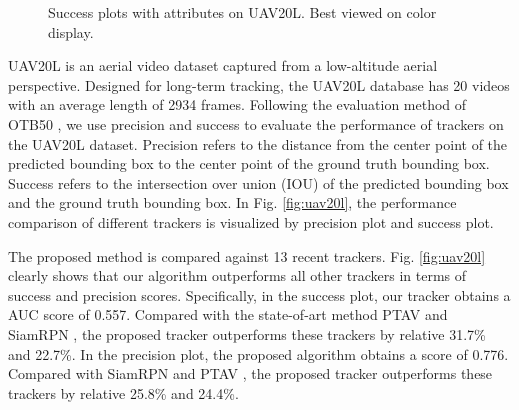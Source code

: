 \begin{figure}
\begin{center}
\end{center}
   \caption{Success plots with attributes on UAV20L. Best viewed on color display.}
\label{fig:uav20l_attr}
\end{figure}
\fi

UAV20L \cite{mueller2016benchmark} is an aerial video dataset captured from a low-altitude aerial perspective. Designed for long-term tracking, the UAV20L database has 20 videos with an average length of 2934 frames. 
Following the evaluation method of OTB50 \cite{wu2013online}, we use precision and success to evaluate the performance of  trackers on the UAV20L dataset. Precision refers to the distance from the center point of the predicted bounding box to the center point of the ground truth bounding box. Success refers to the intersection over union (IOU) of the predicted bounding box and the ground truth bounding box. In Fig. \ref{fig:uav20l}, the performance comparison of different trackers is visualized by precision plot and success plot.

The proposed method is compared against 13 recent trackers. Fig. \ref{fig:uav20l} clearly shows that our algorithm outperforms all other trackers in terms of success and precision scores. Specifically, in the success plot, our tracker obtains a AUC score of 0.557. Compared with the state-of-art method PTAV \cite{fan2018parallel} and SiamRPN \cite{li2018high}, the proposed tracker outperforms these trackers by relative 31.7\% and 22.7\%. In the precision plot, the proposed algorithm obtains a score of 0.776. Compared with SiamRPN \cite{li2018high} and PTAV \cite{fan2018parallel}, the proposed tracker outperforms these trackers by relative 25.8\% and 24.4\%. 

